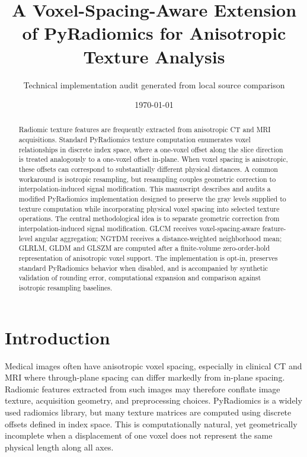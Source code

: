 \documentclass[11pt]{article}
\title{A Voxel-Spacing-Aware Extension of PyRadiomics for Anisotropic Texture Analysis}
\author{Technical implementation audit generated from local source comparison}
\date{\today}
\begin{document}
\maketitle

\begin{abstract}
Radiomic texture features are frequently extracted from anisotropic CT and MRI acquisitions. Standard PyRadiomics texture computation enumerates voxel relationships in discrete index space, where a one-voxel offset along the slice direction is treated analogously to a one-voxel offset in-plane. When voxel spacing is anisotropic, these offsets can correspond to substantially different physical distances. A common workaround is isotropic resampling, but resampling couples geometric correction to interpolation-induced signal modification. This manuscript describes and audits a modified PyRadiomics implementation designed to preserve the gray levels supplied to texture computation while incorporating physical voxel spacing into selected texture operations. The central methodological idea is to separate geometric correction from interpolation-induced signal modification. GLCM receives voxel-spacing-aware feature-level angular aggregation; NGTDM receives a distance-weighted neighborhood mean; GLRLM, GLDM and GLSZM are computed after a finite-volume zero-order-hold representation of anisotropic voxel support. The implementation is opt-in, preserves standard PyRadiomics behavior when disabled, and is accompanied by synthetic validation of rounding error, computational expansion and comparison against isotropic resampling baselines.
\end{abstract}

\section{Introduction}
Medical images often have anisotropic voxel spacing, especially in clinical CT and MRI where through-plane spacing can differ markedly from in-plane spacing. Radiomic features extracted from such images may therefore conflate image texture, acquisition geometry, and preprocessing choices. PyRadiomics is a widely used radiomics library, but many texture matrices are computed using discrete offsets defined in index space. This is computationally natural, yet geometrically incomplete when a displacement of one voxel does not represent the same physical length along all axes.
\end{document}
